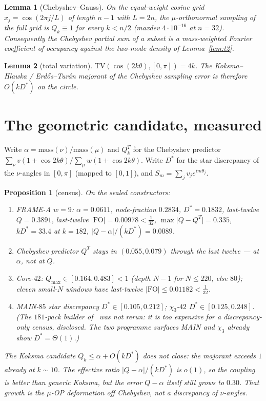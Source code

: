 \documentclass[11pt]{article}
\newtheorem{lemma}{Lemma}
\newtheorem{prop}{Proposition}
\theoremstyle{remark}
\begin{document}
\begin{lemma}[Chebyshev--Gauss]\label{lem:cheb}
On the equal-weight cosine grid $x_j=\cos(2\pi j/L)$ of length
$n-1$ with $L=2n$, the $\mu$-orthonormal sampling of the
\emph{full} grid is $Q_k\equiv 1$ for every $k<n/2$
(maxdev $4\cdot10^{-16}$ at $n=32$).  Consequently the
Chebyshev partial sum of a subset is a mass-weighted Fourier
coefficient of occupancy against the two-mode density of
Lemma~\ref{lem:t2}.
\end{lemma}

\begin{lemma}[total variation]\label{lem:tv}
$\mathrm{TV}(\cos(2k\theta),[0,\pi])=4k$.  The Koksma--Hlawka /
Erd\H{o}s--Tur\'an majorant of the Chebyshev sampling error is
therefore $O(k D^*)$ on the circle.
\end{lemma}

\section{The geometric candidate, measured}\label{sec:geom}

Write $\alpha=\mathrm{mass}(\nu)/\mathrm{mass}(\mu)$ and
$Q_k^T$ for the Chebyshev predictor
$\sum_\nu v(1+\cos 2k\theta)/\sum_\mu w(1+\cos 2k\theta)$.
Write $D^*$ for the star discrepancy of the $\nu$-angles in
$[0,\pi]$ (mapped to $[0,1]$), and
$S_m=\sum_j v_j e^{im\theta_j}$.

\begin{prop}[census]\label{prop:census}
On the sealed constructors:
\begin{enumerate}
\item FRAME-A $w=9$: $\alpha=0.0611$, node-fraction $0.2834$,
  $D^*=0.1832$, last-twelve $Q=0.3891$, last-twelve
  $\lvert\mathrm{FO}\rvert=0.00978<\tfrac1{32}$,
  $\max\lvert Q-Q^T\rvert=0.335$, $kD^*=33.4$ at $k=182$,
  $\lvert Q-\alpha\rvert/(kD^*)=0.0089$.
\item Chebyshev predictor $Q^T$ stays in $(0.055,0.079)$
  through the last twelve --- at $\alpha$, not at $Q$.
\item Core-$42$: $Q_{\max}\in[0.164,0.483]<1$ (depth $N-1$ for
  $N\le 220$, else $80$); eleven small-$N$ windows have
  last-twelve $\lvert\mathrm{FO}\rvert\le 0.01182<\tfrac1{32}$.
\item MAIN-$85$ star discrepancy $D^*\in[0.105,0.212]$;
  $\chi_3$-$42$ $D^*\in[0.125,0.248]$.
  (The $181$-pack builder of~\cite{v3p} was not rerun: it is too
  expensive for a discrepancy-only census, disclosed.  The two
  programme surfaces MAIN and $\chi_3$ already show $D^*=\Theta(1)$.)
\end{enumerate}
The Koksma candidate $Q_k\le\alpha+O(k D^*)$ does not close:
the majorant exceeds $1$ already at $k\sim 10$.  The effective
ratio $\lvert Q-\alpha\rvert/(kD^*)$ is $o(1)$, so the coupling
is better than generic Koksma, but the error $Q-\alpha$ itself
still grows to $0.30$.  That growth is the $\mu$-OP deformation
off Chebyshev, not a discrepancy of $\nu$-angles.
\end{prop}
\end{document}

